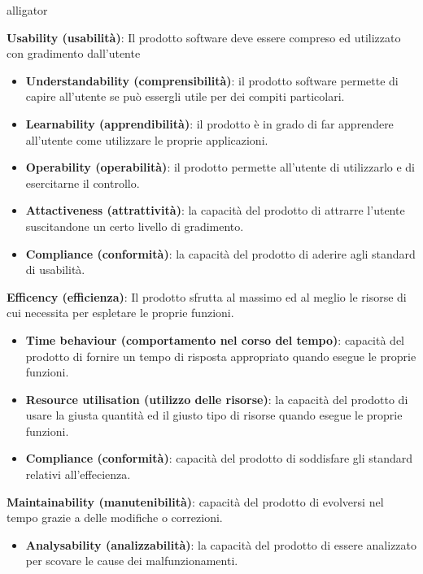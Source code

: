 \begin{labeling}{alligator}
	\item \textbf{Usability (usabilità)}: Il prodotto software deve essere compreso ed utilizzato con gradimento dall'utente
	\begin{itemize}
		\item \textbf{Understandability (comprensibilità)}: il prodotto software permette di capire all'utente se può essergli utile per dei compiti particolari.
		
		\item \textbf{Learnability (apprendibilità)}: il prodotto è in grado di far apprendere all'utente come utilizzare le proprie applicazioni.
		
		\item \textbf{Operability (operabilità)}: il prodotto permette all'utente di utilizzarlo e di esercitarne il controllo.
		
		\item \textbf{Attactiveness (attrattività)}: la capacità del prodotto di attrarre l'utente suscitandone un certo livello di gradimento.
		
		\item \textbf{Compliance (conformità)}: la capacità del prodotto di aderire agli standard di usabilità.
	\end{itemize}
	
	\item \textbf{Efficency (efficienza)}: Il prodotto sfrutta al massimo ed al meglio le risorse di cui necessita per espletare le proprie funzioni.
	\begin{itemize}
		\item \textbf{Time behaviour (comportamento nel corso del tempo)}: capacità del prodotto di fornire un tempo di risposta appropriato quando esegue le proprie funzioni.
		
		\item \textbf{Resource utilisation (utilizzo delle risorse)}: la capacità del prodotto di usare la giusta quantità ed il giusto tipo di risorse quando esegue le proprie funzioni.
		
		\item \textbf{Compliance (conformità)}: capacità del prodotto di soddisfare gli standard relativi all'effecienza.
		
	\end{itemize}
	
	\item \textbf{Maintainability (manutenibilità)}: capacità del prodotto di evolversi nel tempo grazie a delle modifiche o correzioni.
	\begin{itemize}
		\item \textbf{Analysability (analizzabilità)}: la capacità del prodotto di essere analizzato per scovare le cause dei malfunzionamenti.
		

\end{itemize}
\end{labeling}

